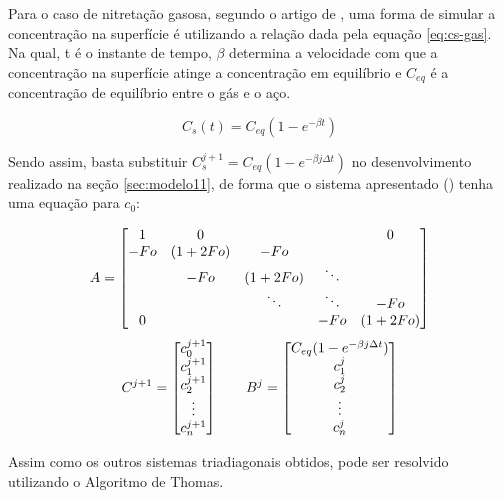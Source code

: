 Para o caso de nitretação gasosa, segundo o artigo de \cite{christiansen2008nitrogen}, uma forma de simular a concentração na superfície é utilizando a relação dada pela equação \autoref{eq:cs-gas}. Na qual, t é o instante de tempo, $\beta$ determina a velocidade com que a concentração na superfície atinge a concentração em equilíbrio e $C_{eq}$ é a concentração de equilíbrio entre o gás e o aço.

\begin{equation}
\label{eq:cs-gas}
C_{s}(t) = C_{eq}(1 - e^{-\beta t})
\end{equation}

Sendo assim, basta substituir $C_s^{j+1} = C_{eq}(1 - e^{-\beta j\Delta t})$ no desenvolvimento realizado na seção \autoref{sec:modelo11}, de forma que o sistema apresentado () tenha uma equação para $c_0$:

\begin{equation*}
	\cmrtext{A} =
	\begin{bmatrix}
		  1 & 0 &         &        & 0\\
		-Fo & (1+2Fo) &  -Fo   &        & \\
		    & -Fo &   (1+2Fo)   & \ddots & \\
		    &     &  \ddots & \ddots & -Fo \\
	     0  &     &         &  -Fo   & (1+2Fo) 
	\end{bmatrix}
\end{equation*}
\begin{equation*}
	\cmrtext{C^{j+1}} =
	\begin{bmatrix}
		c_0^{j+1} \\
		c_1^{j+1} \\
		c_2^{j+1} \\
		\vdots \\
		c_n^{j+1}
	\end{bmatrix}
	\qquad
	\cmrtext{B^j} =	
	\begin{bmatrix}
		C_{eq}(1 - e^{-\beta j\Delta t}) \\
		c_1^j \\
		c_2^{j} \\
		\vdots \\
		c_n^{j}
	\end{bmatrix}
\end{equation*}

Assim como os outros sistemas triadiagonais obtidos, pode ser resolvido utilizando o Algoritmo de Thomas.